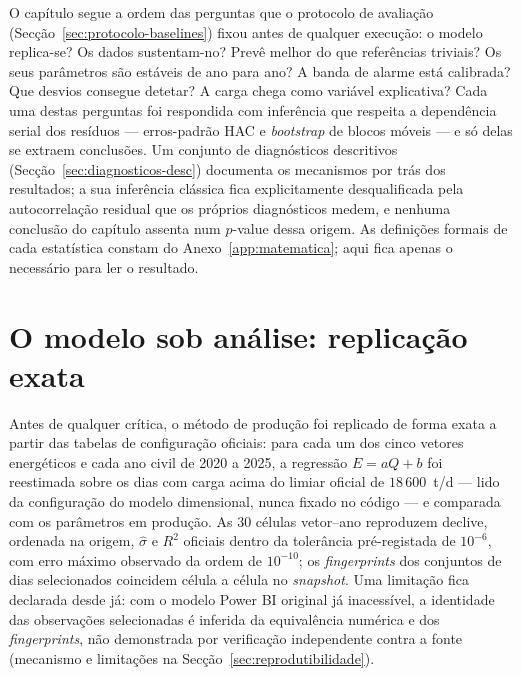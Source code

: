 O capítulo segue a ordem das perguntas que o protocolo de avaliação
(Secção~\ref{sec:protocolo-baselines}) fixou antes de qualquer execução:
o modelo replica-se? Os dados sustentam-no? Prevê melhor do que referências
triviais? Os seus parâmetros são estáveis de ano para ano? A banda de alarme
está calibrada? Que desvios consegue detetar? A carga chega como variável
explicativa? Cada uma destas perguntas foi respondida com inferência que
respeita a dependência serial dos resíduos --- erros-padrão HAC e
\emph{bootstrap} de blocos móveis --- e só delas se extraem conclusões. Um
conjunto de diagnósticos descritivos (Secção~\ref{sec:diagnosticos-desc})
documenta os mecanismos por trás dos resultados; a sua inferência clássica
fica explicitamente desqualificada pela autocorrelação residual que os
próprios diagnósticos medem, e nenhuma conclusão do capítulo assenta num
$p$-value dessa origem. As definições formais de cada estatística constam do
Anexo~\ref{app:matematica}; aqui fica apenas o necessário para ler o
resultado.

\section{O modelo sob análise: replicação exata}
\label{sec:replicacao}

Antes de qualquer crítica, o método de produção foi replicado de forma exata a
partir das tabelas de configuração oficiais: para cada um dos cinco vetores
energéticos e cada ano civil de 2020 a 2025, a regressão $E = aQ + b$ foi
reestimada sobre os dias com carga acima do limiar oficial de
$18\,600$~t/d --- lido da configuração do modelo dimensional, nunca fixado no
código --- e comparada com os parâmetros em produção. As 30 células
vetor--ano reproduzem declive, ordenada na origem, $\hat\sigma$ e $R^2$
oficiais dentro da tolerância pré-registada de $10^{-6}$, com erro máximo
observado da ordem de $10^{-10}$; os \emph{fingerprints} dos conjuntos de
dias selecionados coincidem célula a célula no \emph{snapshot}. Uma
limitação fica declarada desde já: com o modelo Power BI original já
inacessível, a identidade das observações selecionadas é inferida da
equivalência numérica e dos \emph{fingerprints}, não demonstrada por
verificação independente contra a fonte
(mecanismo e limitações na Secção~\ref{sec:reprodutibilidade}).

